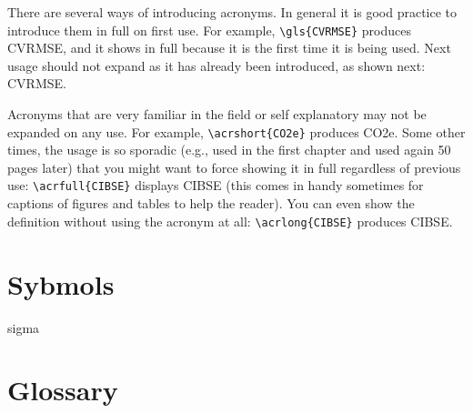 There are several ways of introducing acronyms. 
In general it is good practice to introduce them in full on first use. 
For example, \verb|\gls{CVRMSE}| produces \gls{CVRMSE}, and it shows in full because 
it is the first time it is being used.
Next usage should not expand as it has already been introduced, as shown next: \gls{CVRMSE}.

Acronyms that are very familiar in the field or self explanatory may not be expanded on any use.
For example, \verb|\acrshort{CO2e}| produces \acrshort{CO2e}.
Some other times, the usage is so sporadic 
(e.g., used in the first chapter and used again 50 pages later)
that you might want to force showing it in full regardless of previous use: 
\verb|\acrfull{CIBSE}| displays \acrfull{CIBSE}
(this comes in handy sometimes for captions of figures and tables to help the reader).
You can even show the definition without using the acronym at all: 
\verb|\acrlong{CIBSE}| produces \acrlong{CIBSE}.


\section{Sybmols}
\label{sec:Sybmols}

\gls{sigma}

\section{Glossary}
\label{sec:Glossary}